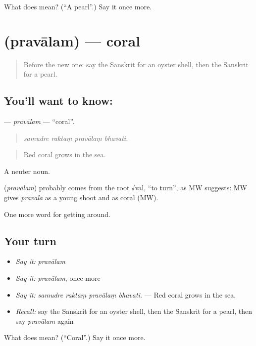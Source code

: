 \begin{tcolorbox}[breakable,colback=teal!4,colframe=teal!35!black,title={Before you move on}]
What does  mean? (\textquotedblleft{}A pearl\textquotedblright{}.) Say it once more.
\end{tcolorbox}
\section[\texorpdfstring{\sk{प्रवालम्} (pravālam)}{प्रवालम् (pravālam)}]{ (pravālam) — coral}

\label{lesson:SA-C418-pravalam}



\begin{quote}
Before the new one: say the Sanskrit for an oyster shell, then the Sanskrit for a pearl.
\end{quote}

\subsection*{You'll want to know: }
\textbf{} — \emph{pravālam} — \textquotedblleft{}coral\textquotedblright{}.

\begin{quote}
   
\end{quote}

\begin{quote}
\emph{samudre raktaṃ pravālaṃ bhavati.}
\end{quote}

\begin{quote}
Red coral grows in the sea.
\end{quote}

A neuter noun.

\begin{cousinweb}
\textbf{} (\emph{pravālam}) probably comes from the root √val, \textquotedblleft{}to turn\textquotedblright{}, as MW suggests: MW gives \emph{pravāla} as a young shoot and as coral (MW).
\end{cousinweb}

\begin{grammarlens}[title={What you've built}]
One more word for getting around.
\end{grammarlens}

\subsection*{Your turn}
\begin{itemize}
\raggedright
  \item \emph{Say it:} \emph{pravālam}
  \item \emph{Say it:} \emph{pravālam}, once more
  \item \emph{Say it:} \emph{samudre raktaṃ pravālaṃ bhavati.} — Red coral grows in the sea.
  \item \emph{Recall:} say the Sanskrit for an oyster shell, then the Sanskrit for a pearl, then say \emph{pravālam} again
\end{itemize}

\begin{tcolorbox}[breakable,colback=teal!4,colframe=teal!35!black,title={Before you move on}]
What does  mean? (\textquotedblleft{}Coral\textquotedblright{}.) Say it once more.
\end{tcolorbox}
